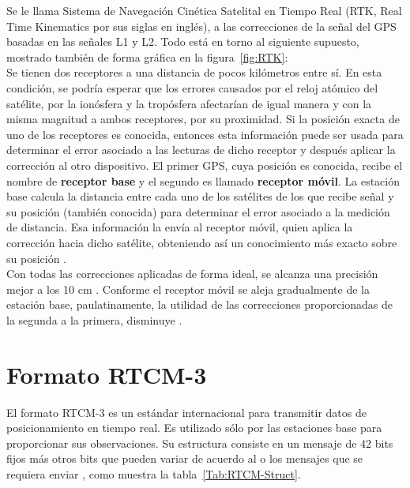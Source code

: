 Se le llama Sistema de Navegación Cinética Satelital en Tiempo Real (RTK, Real Time Kinematics por sus siglas en inglés), a las correcciones de la señal del GPS basadas en las señales L1 y L2. Todo está en torno al siguiente supuesto, mostrado también de forma gráfica en la figura~\ref{fig:RTK}: \\

Se tienen dos receptores a una distancia de pocos kilómetros entre sí. En esta condición, se podría esperar que los errores causados por el reloj atómico del satélite, por la ionósfera y la tropósfera afectarían de igual manera y con la misma magnitud a ambos receptores, por su proximidad. Si la posición exacta de uno de los receptores es conocida, entonces esta información puede ser usada para determinar el error asociado a las lecturas de dicho receptor y después aplicar la corrección al otro dispositivo. El primer GPS, cuya posición es conocida, recibe el nombre de \textbf{receptor base} y el segundo es llamado \textbf{receptor móvil}. La estación base calcula la distancia entre cada uno de los satélites de los que recibe señal y su posición (también conocida) para determinar el error asociado a la medición de distancia. Esa información la envía al receptor móvil, quien aplica la corrección hacia dicho satélite, obteniendo así un conocimiento más exacto sobre su posición \citep{fallas2002sistema}. \\

Con todas las correcciones aplicadas de forma ideal, se alcanza una precisión mejor a los 10 cm \citep{cerrato2011diseno}. Conforme el receptor móvil se aleja gradualmente de la estación base, paulatinamente, la utilidad de las correcciones proporcionadas de la segunda a la primera, disminuye \citep{mueller1994networked}.

\section{Formato RTCM-3}

El formato RTCM-3 es un estándar internacional para transmitir datos de posicionamiento en tiempo real. Es utilizado sólo por las estaciones base para proporcionar sus observaciones. Su estructura consiste en un mensaje de 42 bits fijos más otros bits que pueden variar de acuerdo al o los mensajes que se requiera enviar \citep{rubinov2011review}, como muestra la tabla~\ref{Tab:RTCM-Struct}.\\

